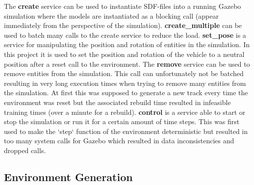 The \textbf{create} service can be used to instantiate SDF-files into a running Gazebo simulation where the models are instantiated as a blocking call (appear immediately from the perspective of the simulation). \textbf{create\_multiple} can be used to batch many calls to the create service to reduce the load. \textbf{set\_pose} is a service for manipulating the position and rotation of entities in the simulation. In this project it is used to set the position and rotation of the vehicle to a neutral position after a reset call to the environment. The \textbf{remove} service can be used to remove entities from the simulation. This call can unfortunately not be batched resulting in very long execution times when trying to remove many entities from the simulation. At first this was supposed to generate a new track every time the environment was reset but the associated rebuild time resulted in infeasible training times (over a minute for a rebuild).
\textbf{control} is a service able to start or stop the simulation or run it for a certain amount of time steps. This was first used to make the `step` function of the environment deterministic but resulted in too many system calls for Gazebo which resulted in data inconsistencies and dropped calls.

\subsection{Environment Generation}

